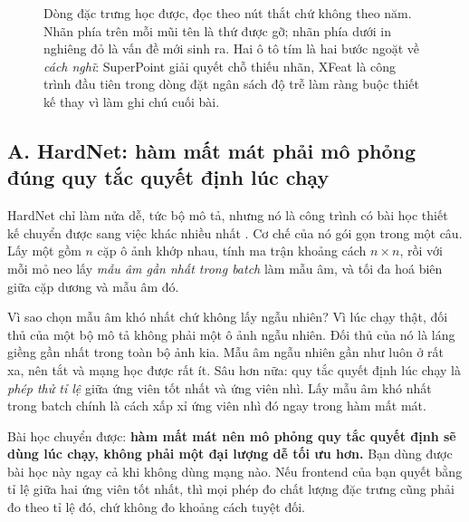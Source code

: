 \documentclass[../../deep_learning.tex]{subfiles}
\begin{document}
\begin{figure}[H]
{}
\caption{Dòng đặc trưng học được, đọc theo nút thắt chứ không theo năm. Nhãn phía trên mỗi mũi tên là thứ được gỡ; nhãn phía dưới in nghiêng đỏ là vấn đề mới sinh ra. Hai ô tô tím là hai bước ngoặt về \emph{cách nghĩ}: SuperPoint giải quyết chỗ thiếu nhãn, XFeat là công trình đầu tiên trong dòng đặt ngân sách độ trễ làm ràng buộc thiết kế thay vì làm ghi chú cuối bài.}
\label{fig:f28-dong-thoi-gian}
\end{figure}

\subsection{A. HardNet: hàm mất mát phải mô phỏng đúng quy tắc quyết định lúc chạy}
HardNet chỉ làm nửa dễ, tức bộ mô tả, nhưng nó là công trình có bài học thiết kế chuyển được sang việc khác nhiều nhất \cite{mishchuk2017hardnet}. Cơ chế của nó gói gọn trong một câu. Lấy một  gồm \(n\) cặp ô ảnh khớp nhau, tính ma trận khoảng cách \(n \times n\), rồi với mỗi mỏ neo lấy \emph{mẫu âm gần nhất trong batch} làm mẫu âm, và tối đa hoá biên giữa cặp dương và mẫu âm đó.

Vì sao chọn mẫu âm khó nhất chứ không lấy ngẫu nhiên? Vì lúc chạy thật, đối thủ của một bộ mô tả không phải một ô ảnh ngẫu nhiên. Đối thủ của nó là láng giềng gần nhất trong toàn bộ ảnh kia. Mẫu âm ngẫu nhiên gần như luôn ở rất xa, nên  tắt và mạng học được rất ít. Sâu hơn nữa: quy tắc quyết định lúc chạy là \emph{phép thử tỉ lệ} giữa ứng viên tốt nhất và ứng viên nhì. Lấy mẫu âm khó nhất trong batch chính là cách xấp xỉ ứng viên nhì đó ngay trong hàm mất mát.

Bài học chuyển được: \textbf{hàm mất mát nên mô phỏng quy tắc quyết định sẽ dùng lúc chạy, không phải một đại lượng dễ tối ưu hơn.} Bạn dùng được bài học này ngay cả khi không dùng mạng nào. Nếu frontend của bạn quyết bằng tỉ lệ giữa hai ứng viên tốt nhất, thì mọi phép đo chất lượng đặc trưng cũng phải đo theo tỉ lệ đó, chứ không đo khoảng cách tuyệt đối.

\end{document}
